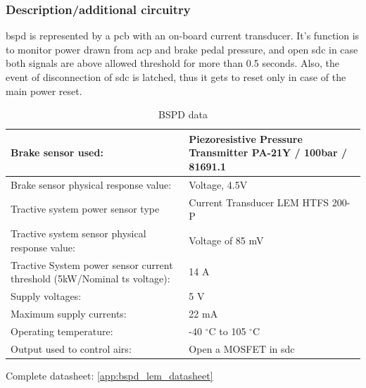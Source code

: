 
\subsubsection{Description/additional circuitry}

\Gls{bspd} is represented by a \gls{pcb} with an on-board current transducer. It’s function is to monitor
power drawn from \gls{acp} and brake pedal pressure, and open \gls{sdc} in case both signals are above
allowed threshold for more than 0.5 seconds. Also, the event of disconnection of \gls{sdc} is latched,
thus it gets to reset only in case of the main power reset.


\begin{table}[H]
	\centering
	\caption{BSPD data}
	\begin{tabu}{|X|X|}
		\hline
		Brake sensor used: & Piezoresistive Pressure Transmitter PA-21Y / 100bar / 81691.1 \\
		\hline
		Brake sensor physical response value: & Voltage, 4.5V \\
		\hline
		Tractive system power sensor type & Current Transducer LEM HTFS 200-P \\
		\hline
		Tractive system sensor physical response value: & Voltage of 85 mV \\
		\hline
		Tractive System power sensor current threshold (5kW/Nominal \gls{ts} voltage): & 14 A \\
		\hline
		Supply voltages: & 5 V \\
		\hline
		Maximum supply currents: & 22 mA \\
		\hline
		Operating temperature: & -40 $^\circ$C to 105 $^\circ$C \\
		\hline
		Output used to control \glspl{air}: & Open a MOSFET in \gls{sdc} \\
		\hline
	\end{tabu}%
	\label{tab:bspd}%
\end{table}%

Complete datasheet: \ref{app:bspd_lem_datasheet}

